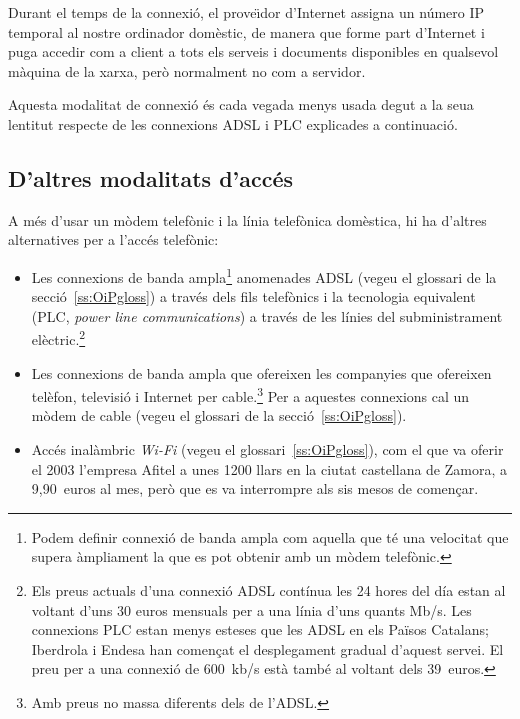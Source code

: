 Durant el temps de la connexió, el prove\"{\i}dor d'Internet assigna
un número IP temporal al nostre ordinador domèstic, de manera
que forme part d'Internet i puga accedir com a client  a tots els
serveis i documents disponibles en qualsevol màquina de la xarxa,
però normalment no com a servidor.

Aquesta modalitat de connexió és cada vegada menys usada degut a la seua lentitut respecte de les connexions ADSL i PLC explicades a continuació.

\subsection{D'altres modalitats d'accés}

A més d'usar un mòdem telefònic i la línia telefònica domèstica, hi ha
d'altres alternatives per a l'accés telefònic:
  \begin{itemize}
  \item Les connexions de banda ampla\footnote{Podem definir connexió
      de banda ampla com aquella que té una velocitat que supera
      àmpliament la que es pot obtenir amb un mòdem telefònic.}
    anomenades ADSL (vegeu el glossari de la secció~\ref{ss:OiPgloss})
    a través dels fils telefònics i la tecnologia equivalent (PLC,
    \emph{power line communications}) a través de les línies del
    subministrament elèctric.\footnote{Els preus actuals d'una
      connexió ADSL contínua les 24 hores del día estan al voltant
      d'uns 30 euros mensuals per a una línia d'uns quants Mb/s. Les
      connexions PLC estan menys esteses que les ADSL en els Països
      Catalans; Iberdrola i Endesa han començat el desplegament
      gradual d'aquest servei. El preu per a una connexió de 600~kb/s
      està també al voltant dels 39~euros.}
  \item Les connexions de banda ampla que ofereixen les companyies que
    ofereixen telèfon, televisió i Internet per cable.\footnote{Amb preus no
      massa diferents dels de l'ADSL.} Per a aquestes connexions cal un mòdem
    de cable (vegeu el glossari de la secció~\ref{ss:OiPgloss}).
   \item Accés inalàmbric \emph{Wi-Fi} (vegeu el glossari~\ref{ss:OiPgloss}),
     com el que va oferir el 2003 l'empresa Afitel a unes 1200 llars en la
     ciutat castellana de Zamora, a 9,90~euros al mes, però que es va
     interrompre als sis mesos de començar.
  \end{itemize}

